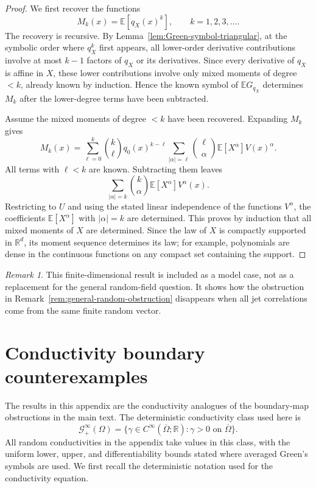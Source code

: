 \documentclass[11pt]{article}
\newcommand{\OmegaD}{\Omega}
\newcommand{\R}{\mathbb R}
\newcommand{\E}{\mathbb E}
\theoremstyle{plain}
\theoremstyle{definition}
\theoremstyle{remark}
\newtheorem{remark}[theorem]{Remark}
\begin{document}
\begin{proof}
We first recover the functions
\[
  M_k(x)=\E[q_X(x)^k],
  \qquad k=1,2,3,\ldots.
\]
The recovery is recursive.  By Lemma~\ref{lem:Green-symbol-triangular}, at the symbolic order where $q_X^k$ first appears, all lower-order derivative contributions involve at most $k-1$ factors of $q_X$ or its derivatives.  Since every derivative of $q_X$ is affine in $X$, these lower contributions involve only mixed moments of degree $<k$, already known by induction.  Hence the known symbol of $\E G_{q_X}$ determines $M_k$ after the lower-degree terms have been subtracted.

Assume the mixed moments of degree $<k$ have been recovered.  Expanding $M_k$ gives
\[
  M_k(x)=\sum_{\ell=0}^k\binom{k}{\ell}q_0(x)^{k-\ell}
  \sum_{|\alpha|=\ell}\binom{\ell}{\alpha}
  \E[X^\alpha]V(x)^\alpha.
\]
All terms with $\ell<k$ are known.  Subtracting them leaves
\[
  \sum_{|\alpha|=k}\binom{k}{\alpha}\E[X^\alpha]V^\alpha(x).
\]
Restricting to $U$ and using the stated linear independence of the functions $V^\alpha$, the coefficients $\E[X^\alpha]$ with $|\alpha|=k$ are determined.  This proves by induction that all mixed moments of $X$ are determined.  Since the law of $X$ is compactly supported in $\mathbb R^d$, its moment sequence determines its law; for example, polynomials are dense in the continuous functions on any compact set containing the support.
\end{proof}

\begin{remark}
This finite-dimensional result is included as a model case, not as a replacement for the general random-field question.  It shows how the obstruction in Remark~\ref{rem:general-random-obstruction} disappears when all jet correlations come from the same finite random vector.
\end{remark}




\appendix

\section{Conductivity boundary counterexamples}
\label{app:conductivity-DN-counterexamples}

The results in this appendix are the conductivity analogues of the boundary-map obstructions in the main text.  The deterministic conductivity class used here is
\[
  \mathcal G_+^\infty(\OmegaD)
  =\{\gamma\in C^\infty(\overline\OmegaD;\R):\gamma>0\text{ on }\overline\OmegaD\}.
\]
All random conductivities in the appendix take values in this class, with the uniform lower, upper, and differentiability bounds stated where averaged Green's symbols are used.  We first recall the deterministic notation used for the conductivity equation.
\end{document}
